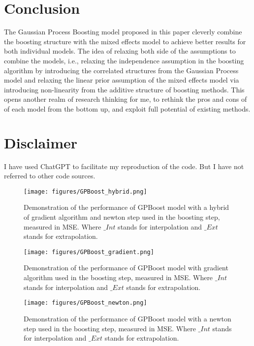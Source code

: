 \documentclass[12pt,a4paper]{article}
\begin{document}
\section{Conclusion}
The Gaussian Process Boosting model proposed in this paper cleverly combine the boosting structure with the mixed effects model to achieve better results for both individual models. The idea of relaxing both side of the assumptions to combine the models, i.e., relaxing the independence assumption in the boosting algorithm by introducing the correlated structures from the Gaussian Process model and relaxing the linear prior assumption of the mixed effects model via introducing non-linearity from the additive structure of boosting methods. This opens another realm of research thinking for me, to rethink the pros and cons of of each model from the bottom up, and exploit full potential of existing methods.


\section{Disclaimer}

I have used ChatGPT to facilitate my reproduction of the code. But I have not referred to other code sources. 


\begin{figure}
    \centering
    \texttt{[image: figures/GPBoost\_hybrid.png]}
    \caption{\small Demonstration of the performance of GPBoost model with a hybrid of gradient algorithm and newton step used in the boosting step, measured in MSE. Where $\_Int$ stands for interpolation and $\_Ext$ stands for extrapolation. }
    \label{fig:GPB_hybrid}
\end{figure}

\begin{figure}
    \centering
    \texttt{[image: figures/GPBoost\_gradient.png]}
    \caption{\small Demonstration of the performance of GPBoost model with gradient algorithm used in the boosting step, measured in MSE. Where $\_Int$ stands for interpolation and $\_Ext$ stands for extrapolation. }
    \label{fig:GPB_grad}
\end{figure}

\begin{figure}
    \centering
    \texttt{[image: figures/GPBoost\_newton.png]}
    \caption{\small Demonstration of the performance of GPBoost model with a newton step used in the boosting step, measured in MSE. Where $\_Int$ stands for interpolation and $\_Ext$ stands for extrapolation. }
    \label{fig:GPB_newton}
\end{figure}
\end{document}
